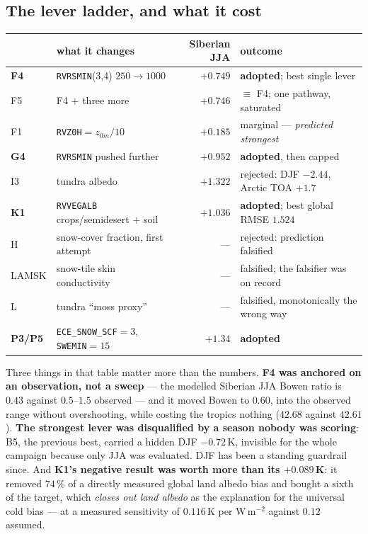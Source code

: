 \documentclass[10pt]{article}
\begin{document}
\subsection{The lever ladder, and what it cost}
\begin{center}\footnotesize
\begin{tabular}{l l r l}
\toprule
 & what it changes & Siberian JJA & outcome \\
\midrule
\textbf{F4} & \texttt{RVRSMIN}(3,4) $250\to1000$ & $+0.749$ & \textbf{adopted}; best single lever \\
F5 & F4 $+$ three more                            & $+0.746$ & $\equiv$ F4; one pathway, saturated \\
F1 & \texttt{RVZ0H}$=z_{0m}/10$                   & $+0.185$ & marginal --- \emph{predicted strongest} \\
\textbf{G4} & \texttt{RVRSMIN} pushed further      & $+0.952$ & \textbf{adopted}, then capped \\
I3 & tundra albedo                                 & $+1.322$ & rejected: DJF $-2.44$, Arctic TOA $+1.7$ \\
\textbf{K1} & \texttt{RVVEGALB} crops/semidesert $+$ soil & $+1.036$ & \textbf{adopted}; best global RMSE $1.524$ \\
H & snow-cover fraction, first attempt             & --- & rejected: prediction falsified \\
LAMSK & snow-tile skin conductivity                & --- & falsified; the falsifier was on record \\
L & tundra ``moss proxy''                          & --- & falsified, monotonically the wrong way \\
\textbf{P3/P5} & \texttt{ECE\_SNOW\_SCF}$=3$, \texttt{SWEMIN}$=15$ & $+1.34$ & \textbf{adopted} \\
\bottomrule
\end{tabular}
\end{center}

\noindent Three things in that table matter more than the numbers. \textbf{F4 was anchored on
an observation, not a sweep} --- the modelled Siberian JJA Bowen ratio is $0.43$ against
$0.5$--$1.5$ observed --- and it moved Bowen to $0.60$, into the observed range without
overshooting, while costing the tropics nothing ($42.68$ against $42.61$). \textbf{The
strongest lever was disqualified by a season nobody was scoring}: B5, the previous best,
carried a hidden DJF $-0.72$\,K, invisible for the whole campaign because only JJA was
evaluated. DJF has been a standing guardrail since. And \textbf{K1's negative result was
worth more than its $+0.089$\,K}: it removed $74\,\%$ of a directly measured global land
albedo bias and bought a sixth of the target, which \emph{closes out land albedo} as the
explanation for the universal cold bias --- at a measured sensitivity of $0.116$\,K per
W\,m$^{-2}$ against $0.12$ assumed.
\end{document}
